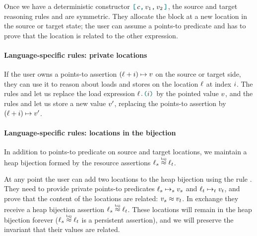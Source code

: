 Once we have a deterministic constructor $\datalangBlockDet{c}{\datalangVal_1}{\datalangVal_2}$, the source and target reasoning rules  and  are symmetric.
%
They allocate the block at a new location in the source or target state; the user can assume a points-to predicate and has to prove that the location is related to the other expression.

\paragraph{Language-specific rules: private locations}
%
If the user owns a points-to assertion $(\datalangLoc + \datalangIdx) \iPointsto \datalangVal$ on the source or target side, they can use it to reason about loads and stores on the location $\datalangLoc$ at index $\datalangIdx$. The rules  and  let us replace the load expression $\datalangLoad{\datalangLoc}{\datalangIdx}$ by the pointed value $\datalangVal$, and the rules  and  let us store a new value $\datalangVal'$, replacing the points-to assertion by $(\datalangLoc + \datalangIdx) \iPointsto \datalangVal'$.

\paragraph{Language-specific rules: locations in the bijection}
%
In addition to points-to predicate on source and target locations, we maintain a heap bijection formed by the resource assertions $\datalangLoc_s \iInBij \datalangLoc_t$.

At any point the user can add two locations to the heap bijection using the rule . They need to provide private points-to predicates $\datalangLoc_s \iPointsto_s \datalangVal_s$ and $\datalangLoc_t \iPointsto_t \datalangVal_t$, and prove that the content of the locations are related: $\datalangVal_s \iSimilar \datalangVal_t$.
%
In exchange they receive a heap bijection assertion $\datalangLoc_s \iInBij \datalangLoc_t$. These locations will remain in the heap bijection forever ($\datalangLoc_s \iInBij \datalangLoc_t$ is a persistent assertion), and we will preserve the invariant that their values are related.

